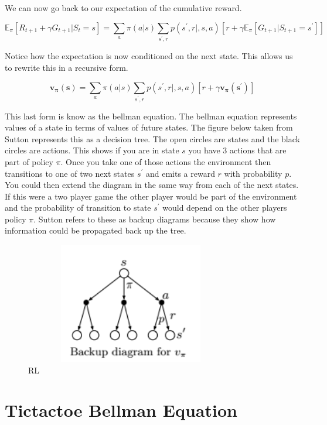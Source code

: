 We can now go back to our expectation of the cumulative reward. 

$$\mathbb{E}_{\pi}[R_{t + 1} + \gamma G_{t + 1} | S_{t} = s] = \underset{a}{\sum}\pi(a|s)\underset{s^{'},r}{\sum}p(s^{'},r|,s,a)[ r + \gamma \mathbb{E}_{\pi}[G_{t + 1} | S_{t + 1} = s^{'}]] $$

Notice how the expectation is now conditioned on the next state. This allows us to rewrite this in a recursive form.

\begin{equation}\label{Bellman State Value Equation}
\mathbf{v_{\pi}(s)} = \underset{a}{\sum}\pi(a|s)\underset{s^{'},r}{\sum}p(s^{'},r|,s,a)[ r + \gamma \mathbf{v_{\pi}(s^{'})}]
\end{equation}

This last form is know as the bellman equation. The bellman equation represents values of a state in terms of values of future states. The figure below taken from Sutton represents this as a decision tree. The open circles are states and the black circles are actions. This shows if you are in state $s$ you have 3 actions that are part of policy $\pi$. Once you take one of those actions the environment then transitions to one of two next states $s^{'}$ and emits a reward $r$ with probability $p$. You could then extend the diagram in the same way from each of the next states. If this were a two player game the other player would be part of the environment and the probability of transition to state $s^{'}$ would depend on the other players policy $\pi$. Sutton refers to these as backup diagrams because they show how information could be propagated back up the tree. 

\begin{figure}[H]
        \centering
        \includegraphics[width=350px,height=200px]{images/bellman_update.png}
        \caption{RL}
        \label{fig:my_label}
\end{figure}

\section{Tictactoe Bellman Equation}

